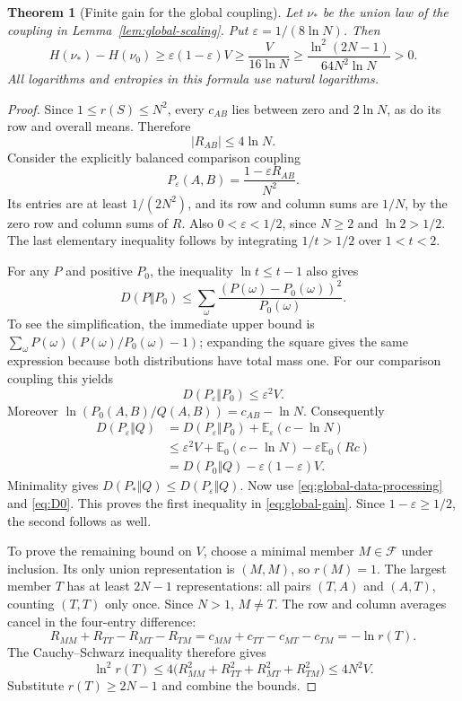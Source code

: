 \documentclass[11pt]{article}
\newtheorem{theorem}{Theorem}[section]
\theoremstyle{remark}
\newcommand{\F}{\mathcal F}
\begin{document}
\begin{theorem}[Finite gain for the global coupling]\label{thm:global-gain}
Let \(\nu_*\) be the union law of the coupling in
Lemma~\ref{lem:global-scaling}. Put \(\varepsilon=1/(8\ln N)\).
Then
\begin{equation}\label{eq:global-gain}
H(\nu_*)-H(\nu_0)
\ge \varepsilon(1-\varepsilon)V
\ge \frac{V}{16\ln N}
\ge \frac{\ln^2(2N-1)}{64N^2\ln N}>0.
\end{equation}
All logarithms and entropies in this formula use natural logarithms.
\end{theorem}
\begin{proof}
Since \(1\le r(S)\le N^2\), every \(c_{AB}\) lies between zero and
\(2\ln N\), as do its row and overall means. Therefore
\[
|R_{AB}|\le4\ln N.
\]
Consider the explicitly balanced comparison coupling
\[
P_\varepsilon(A,B)=\frac{1-\varepsilon R_{AB}}{N^2}.
\]
Its entries are at least \(1/(2N^2)\), and its row and column sums
are \(1/N\), by the zero row and column sums of \(R\).
Also \(0<\varepsilon<1/2\), since \(N\ge2\) and \(\ln2>1/2\).
The last elementary inequality follows by integrating \(1/t>1/2\)
over \(1<t<2\).

For any \(P\) and positive \(P_0\), the inequality \(\ln t\le t-1\)
also gives
\[
D(P\Vert P_0)
\le \sum_\omega\frac{(P(\omega)-P_0(\omega))^2}{P_0(\omega)}.
\]
To see the simplification, the immediate upper bound is
\(\sum_\omega P(\omega)(P(\omega)/P_0(\omega)-1)\);
expanding the square gives the same expression because both
distributions have total mass one.
For our comparison coupling this yields
\[
D(P_\varepsilon\Vert P_0)\le\varepsilon^2V.
\]
Moreover \(\ln(P_0(A,B)/Q(A,B))=c_{AB}-\ln N\). Consequently
\begin{align*}
D(P_\varepsilon\Vert Q)
&=D(P_\varepsilon\Vert P_0)
  +\mathbb E_\varepsilon(c-\ln N)\\
&\le \varepsilon^2V+\mathbb E_0(c-\ln N)
                -\varepsilon\mathbb E_0(Rc)\\
&=D(P_0\Vert Q)-\varepsilon(1-\varepsilon)V.
\end{align*}
Minimality gives \(D(P_*\Vert Q)\le D(P_\varepsilon\Vert Q)\).
Now use \eqref{eq:global-data-processing} and \eqref{eq:D0}.
This proves the first inequality in \eqref{eq:global-gain}.
Since \(1-\varepsilon\ge1/2\), the second follows as well.

To prove the remaining bound on \(V\), choose a minimal member
\(M\in\F\) under inclusion. Its only union representation is \((M,M)\),
so \(r(M)=1\). The largest member \(T\) has at least \(2N-1\)
representations: all pairs \((T,A)\) and \((A,T)\), counting \((T,T)\)
only once. Since \(N>1\), \(M\ne T\).
The row and column averages cancel in the four-entry difference:
\[
R_{MM}+R_{TT}-R_{MT}-R_{TM}
=c_{MM}+c_{TT}-c_{MT}-c_{TM}=-\ln r(T).
\]
The Cauchy--Schwarz inequality therefore gives
\[
\ln^2 r(T)
\le4\bigl(R_{MM}^2+R_{TT}^2+R_{MT}^2+R_{TM}^2\bigr)
\le4N^2V.
\]
Substitute \(r(T)\ge2N-1\) and combine the bounds.
\end{proof}
\end{document}
